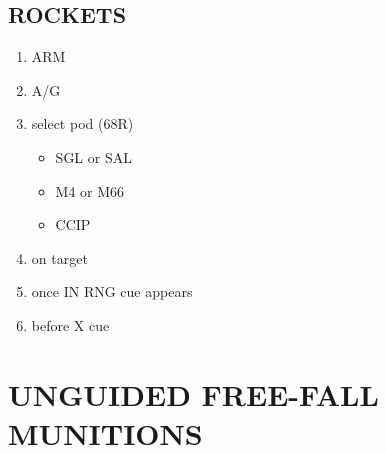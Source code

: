 \documentclass[fontHelvetica, widesubsec]{TechCheck}
\begin{document}
	\subsection{ROCKETS}
	\begin{enumerate}
		\item {}\dotfill ARM
		\item {}\dotfill A/G
		\item {}\dotfill select pod (68R)
		\begin{itemize}
			\item {} SGL or SAL
			\item {} M4 or M66
			\item {} CCIP
		\end{itemize}
		\item {}\dotfill on target
		\item {}\dotfill once IN RNG cue appears
		\item {}\dotfill before X cue
	\end{enumerate}

	\section{UNGUIDED FREE-FALL MUNITIONS}
\end{document}
